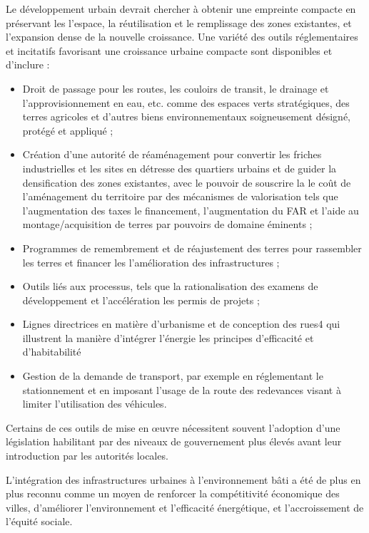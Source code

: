 Le développement urbain devrait chercher à obtenir une empreinte compacte en préservant les
l'espace, la réutilisation et le remplissage des zones existantes, et l'expansion dense de la nouvelle croissance.
Une variété des outils réglementaires et incitatifs favorisant une croissance urbaine compacte sont disponibles
et d'inclure :

\begin{itemize}
\item Droit de passage pour les routes, les couloirs de transit, le drainage et l'approvisionnement en eau, etc.
comme des espaces verts stratégiques, des terres agricoles et d'autres biens environnementaux soigneusement
désigné, protégé et appliqué ;
\item Création d'une autorité de réaménagement pour convertir les friches industrielles et les sites en détresse
des quartiers urbains et de guider la densification des zones existantes, avec le pouvoir de souscrire la
le coût de l'aménagement du territoire par des mécanismes de valorisation tels que l'augmentation des taxes
le financement, l'augmentation du FAR et l'aide au montage/acquisition de terres par
pouvoirs de domaine éminents ;
\item Programmes de remembrement et de réajustement des terres pour rassembler les terres et financer les
l'amélioration des infrastructures ;
\item Outils liés aux processus, tels que la rationalisation des examens de développement et l'accélération
les permis de projets ;
\item Lignes directrices en matière d'urbanisme et de conception des rues4 qui illustrent la manière d'intégrer l'énergie
les principes d'efficacité et d'habitabilité
\item Gestion de la demande de transport, par exemple en réglementant le stationnement et en imposant l'usage de la route
des redevances visant à limiter l'utilisation des véhicules.

\end{itemize}

Certains de ces outils de mise en œuvre nécessitent souvent l'adoption d'une législation habilitant par
des niveaux de gouvernement plus élevés avant leur introduction par les autorités locales.

L'intégration des infrastructures urbaines à l'environnement bâti a été de plus en plus
reconnu comme un moyen de renforcer la compétitivité économique des villes, d'améliorer
l'environnement et l'efficacité énergétique, et l'accroissement de l'équité sociale.

